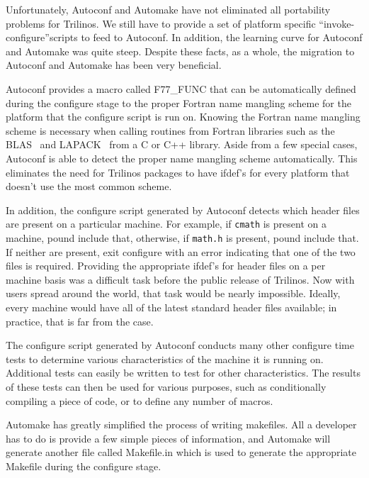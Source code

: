 \documentclass[12pt,relax]{article}
\newcommand{\InlineDirectory}[1]{
  {\hspace{0.01 in}} {\tt #1} {\hspace{0.01 in}}}
\begin{document}
Unfortunately, Autoconf and Automake have not eliminated all portability 
problems for Trilinos.  We still have to provide a set of platform specific
``invoke-configure''scripts to feed to Autoconf.  In addition, the learning 
curve for Autoconf and Automake was quite steep.  Despite these facts, 
as a whole, the migration to Autoconf and Automake has been very 
beneficial.  

Autoconf provides a macro called F77\_FUNC that can be 
automatically defined during the configure stage to the proper Fortran
name mangling scheme for the platform that the configure script is run on.  
Knowing the Fortran name mangling scheme is necessary when calling routines 
from Fortran libraries such as the BLAS~\cite{BLAS1,BLAS2,BLAS3} and 
LAPACK~\cite{lapack} from a C or C++ library.  Aside from a few special cases, 
Autoconf is able to detect the proper name mangling scheme automatically.  
This eliminates the need for Trilinos packages to have ifdef's for every 
platform that doesn't use the most common scheme.

In addition, the configure script generated by Autoconf detects which 
header files are present on a particular 
machine.  For example, if \InlineDirectory{cmath} is present on a machine, 
pound include that, otherwise, if \InlineDirectory{math.h} is present, pound 
include that.  If neither are present, exit configure with an error indicating 
that one of the two files is required.  Providing the appropriate ifdef's 
for header files on a per machine basis was a difficult task before the 
public release of Trilinos.  Now with users spread around the world, that 
task would be nearly impossible.  Ideally, every machine would 
have all of the latest standard header files available; in practice, that 
is far from the case.

The configure script generated by Autoconf conducts many other configure 
time tests to determine various 
characteristics of the machine it is running on.  Additional tests can 
easily be written to test for other characteristics.  The results of these 
tests can then be used for various purposes, such as conditionally compiling 
a piece of code, or to define any number of macros.

Automake has greatly simplified the process of writing makefiles.  All a 
developer has to do is provide a few simple pieces of information, and 
Automake will generate another file called Makefile.in which is used to 
generate the appropriate Makefile during the configure stage.
\end{document}
